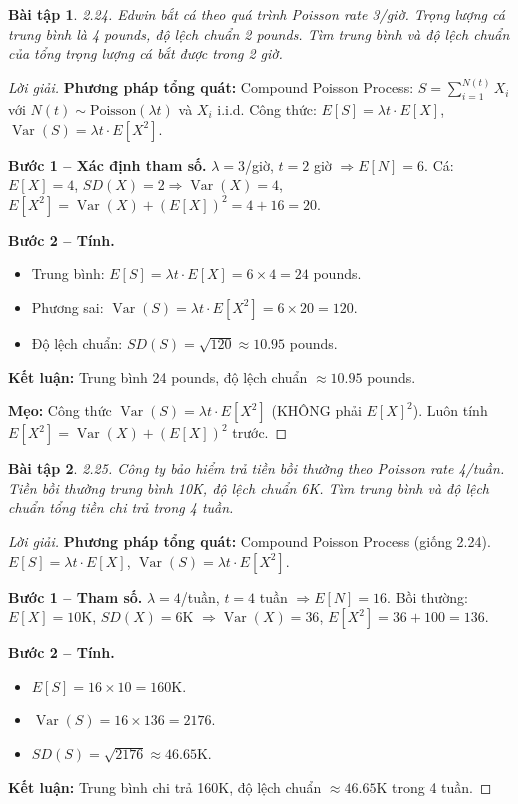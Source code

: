 \documentclass[8pt,a4paper]{article}
\newtheorem{exercise}{Bài tập}
\newenvironment{solution}{\begin{proof}[Lời giải]}{\end{proof}}
\newcommand{\Var}{\operatorname{Var}}
\begin{document}
\begin{exercise}
2.24. Edwin bắt cá theo quá trình Poisson rate 3/giờ. Trọng lượng cá trung bình là 4 pounds, độ lệch chuẩn 2 pounds. Tìm trung bình và độ lệch chuẩn của tổng trọng lượng cá bắt được trong 2 giờ.
\end{exercise}
\begin{solution}
\textbf{Phương pháp tổng quát:} Compound Poisson Process: $S = \sum_{i=1}^{N(t)} X_i$ với $N(t) \sim \text{Poisson}(\lambda t)$ và $X_i$ i.i.d. Công thức: $E[S] = \lambda t \cdot E[X]$, $\Var(S) = \lambda t \cdot E[X^2]$.

\textbf{Bước 1 -- Xác định tham số.} $\lambda = 3$/giờ, $t = 2$ giờ $\Rightarrow E[N] = 6$. Cá: $E[X] = 4$, $SD(X) = 2 \Rightarrow \Var(X) = 4$, $E[X^2] = \Var(X) + (E[X])^2 = 4 + 16 = 20$.

\textbf{Bước 2 -- Tính.}
\begin{itemize}[nosep]
  \item Trung bình: $E[S] = \lambda t \cdot E[X] = 6 \times 4 = \boxed{24}$ pounds.
  \item Phương sai: $\Var(S) = \lambda t \cdot E[X^2] = 6 \times 20 = 120$.
  \item Độ lệch chuẩn: $SD(S) = \sqrt{120} \approx \boxed{10.95}$ pounds.
\end{itemize}

\textbf{Kết luận:} Trung bình 24 pounds, độ lệch chuẩn $\approx 10.95$ pounds.

\textbf{Mẹo:} Công thức $\Var(S) = \lambda t \cdot E[X^2]$ (KHÔNG phải $E[X]^2$). Luôn tính $E[X^2] = \Var(X) + (E[X])^2$ trước.
\end{solution}

\begin{exercise}
2.25. Công ty bảo hiểm trả tiền bồi thường theo Poisson rate 4/tuần. Tiền bồi thường trung bình 10K, độ lệch chuẩn 6K. Tìm trung bình và độ lệch chuẩn tổng tiền chi trả trong 4 tuần.
\end{exercise}
\begin{solution}
\textbf{Phương pháp tổng quát:} Compound Poisson Process (giống 2.24). $E[S] = \lambda t \cdot E[X]$, $\Var(S) = \lambda t \cdot E[X^2]$.

\textbf{Bước 1 -- Tham số.} $\lambda = 4$/tuần, $t = 4$ tuần $\Rightarrow E[N] = 16$. Bồi thường: $E[X] = 10$K, $SD(X) = 6$K $\Rightarrow \Var(X) = 36$, $E[X^2] = 36 + 100 = 136$.

\textbf{Bước 2 -- Tính.}
\begin{itemize}[nosep]
  \item $E[S] = 16 \times 10 = \boxed{160}$K.
  \item $\Var(S) = 16 \times 136 = 2176$.
  \item $SD(S) = \sqrt{2176} \approx \boxed{46.65}$K.
\end{itemize}

\textbf{Kết luận:} Trung bình chi trả 160K, độ lệch chuẩn $\approx 46.65$K trong 4 tuần.
\end{solution}
\end{document}
